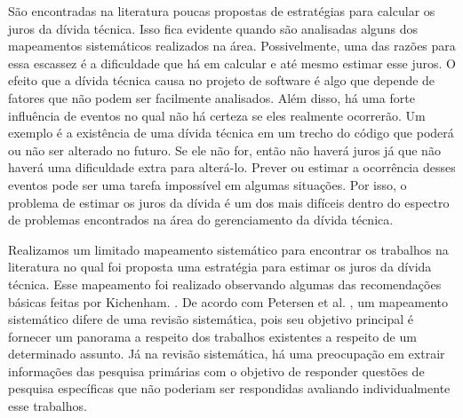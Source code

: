 São encontradas na literatura poucas propostas de estratégias para calcular os juros da dívida técnica.  Isso fica evidente quando são analisadas alguns dos mapeamentos sistemáticos realizados na área\cite{ampatzoglou2015financial,li2015systematic,behutiye2017analyzing}. Possivelmente, uma das razões para essa escassez é a dificuldade que há em calcular e até mesmo estimar esse juros. O efeito que a dívida técnica causa no projeto de software é algo que depende de fatores que não podem ser facilmente analisados. Além disso, há uma forte influência de eventos no qual não há certeza se eles realmente ocorrerão. Um exemplo é a existência de uma dívida técnica em um trecho do código que poderá ou não ser alterado no futuro. Se ele não for, então não haverá juros já que não haverá uma dificuldade extra para alterá-lo. Prever ou estimar a ocorrência desses eventos pode ser uma tarefa impossível em algumas situações. Por isso, o problema de estimar os juros da dívida é um dos mais difíceis dentro do espectro de problemas encontrados na área do gerenciamento da dívida técnica.


Realizamos um limitado mapeamento sistemático para encontrar os trabalhos na literatura no qual foi proposta uma estratégia para estimar os juros da dívida técnica. Esse mapeamento foi realizado observando algumas das recomendações básicas feitas por Kichenham. \cite{kitchenham2004procedures}. De acordo com Petersen et al. \cite{petersen2008systematic}, um mapeamento sistemático difere de uma revisão sistemática, pois seu objetivo principal é fornecer um panorama a respeito dos  trabalhos existentes a respeito de um determinado assunto. Já na revisão sistemática, há uma preocupação em extrair informações das pesquisa primárias com o objetivo de responder questões de pesquisa específicas que não poderiam ser respondidas avaliando individualmente esse trabalhos. 

